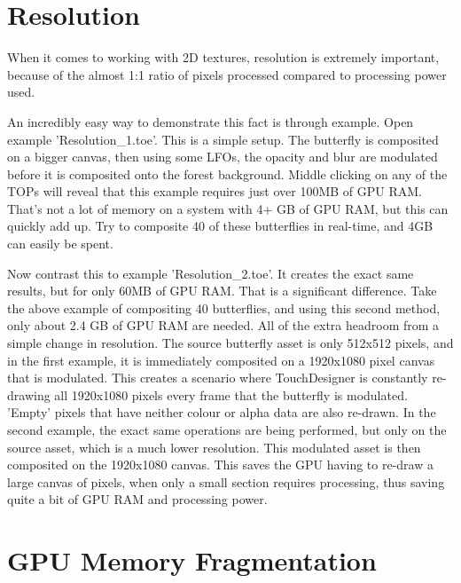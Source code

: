 
\section{Resolution}

\begin{fullwidth}

When it comes to working with 2D textures, resolution is extremely important, because of the almost 1:1 ratio of pixels processed compared to processing power used.

An incredibly easy way to demonstrate this fact is through example. Open example 'Resolution\_1.toe'. This is a simple setup. The butterfly is composited on a bigger canvas, then using some LFOs, the opacity and blur are modulated before it is composited onto the forest background.  Middle clicking on any of the TOPs will reveal that this example requires just over 100MB of GPU RAM. That's not a lot of memory on a system with 4+ GB of GPU RAM, but this can quickly add up. Try to composite 40 of these butterflies in real-time, and 4GB can easily be spent. 

Now contrast this to example 'Resolution\_2.toe'. It creates the exact same results, but for only 60MB of GPU RAM. That is a significant difference. Take the above example of compositing 40 butterflies, and using this second method, only about 2.4 GB of GPU RAM are needed. All of the extra headroom from a simple change in resolution. The source butterfly asset is only 512x512 pixels, and in the first example, it is immediately composited on a 1920x1080 pixel canvas that is modulated. This creates a scenario where TouchDesigner is constantly re-drawing all 1920x1080 pixels every frame that the butterfly is modulated. 'Empty' pixels that have neither colour or alpha data are also re-drawn. In the second example, the exact same operations are being performed, but only on the source asset, which is a much lower resolution. This modulated asset is then composited on the 1920x1080 canvas. This saves the GPU having to re-draw a large canvas of pixels, when only a small section requires processing, thus saving quite a bit of GPU RAM and processing power.

\end{fullwidth}


\section{GPU Memory Fragmentation}

